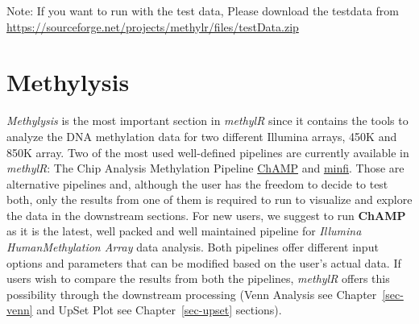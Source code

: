 \documentclass[
  a4paper,
  DIV=11,
  numbers=noendperiod,
  oneside,
  open=any]{scrreport}
\begin{document}
\begin{tcolorbox}[enhanced jigsaw, opacityback=0, toprule=.15mm, bottomtitle=1mm, colback=white, rightrule=.15mm, breakable, coltitle=black, colbacktitle=quarto-callout-note-color!10!white, toptitle=1mm, arc=.35mm, colframe=quarto-callout-note-color-frame, bottomrule=.15mm, opacitybacktitle=0.6, titlerule=0mm, leftrule=.75mm, title=\textcolor{quarto-callout-note-color}{\faInfo}\hspace{0.5em}{Note}, left=2mm]

Note: If you want to run with the test data, Please download the
testdata from
\url{https://sourceforge.net/projects/methylr/files/testData.zip}

\end{tcolorbox}

\chapter{Methylysis}\label{sec-methylysis}

\emph{Methylysis} is the most important section in \emph{methylR} since
it contains the tools to analyze the DNA methylation data for two
different Illumina arrays, 450K and 850K array. Two of the most used
well-defined pipelines are currently available in \emph{methylR}: The
Chip Analysis Methylation Pipeline
\href{https://bioconductor.org/packages/release/bioc/vignettes/ChAMP/inst/doc/ChAMP.html}{ChAMP}
and
\href{https://bioconductor.org/packages/release/bioc/vignettes/minfi/inst/doc/minfi.html}{minfi}.
Those are alternative pipelines and, although the user has the freedom
to decide to test both, only the results from one of them is required to
run to visualize and explore the data in the downstream sections. For
new users, we suggest to run \textbf{ChAMP} as it is the latest, well
packed and well maintained pipeline for \emph{Illumina HumanMethylation
Array} data analysis. Both pipelines offer different input options and
parameters that can be modified based on the user's actual data. If
users wish to compare the results from both the pipelines,
\emph{methylR} offers this possibility through the downstream processing
(Venn Analysis see Chapter~\ref{sec-venn} and UpSet Plot see
Chapter~\ref{sec-upset} sections).
\end{document}
